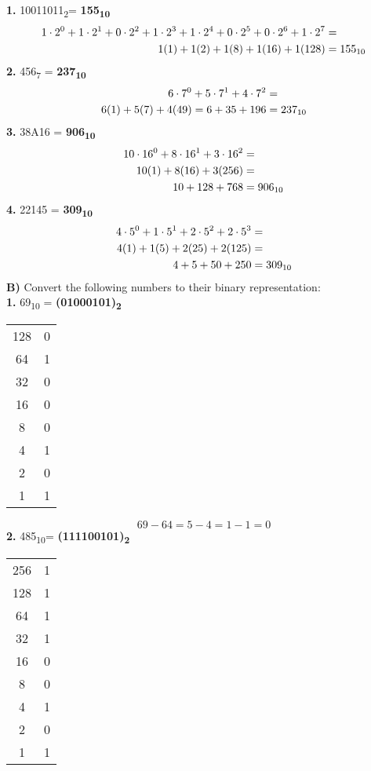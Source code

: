 \documentclass[12pt, letterpaper, twoside]{article}
\begin{document}
\noindent \textbf{1.}  10011011\textsubscript{2}= \textbf{155\textsubscript{10}}
\begin{align*}
1\cdot2^0+1\cdot2^1+0\cdot2^2+1\cdot2^3+1\cdot2^4+0\cdot2^5+0\cdot2^6+1\cdot2^7&= \\
1(1)+1(2)+1(8)+1(16)+1(128)&= 155\textsubscript{10}\\
\end{align*}
\break
\noindent \textbf{2.} 456\textsubscript{7} = \textbf{237\textsubscript{10}}
\begin{align*}
6\cdot7^0+5\cdot7^1+4\cdot7^2&=\\
6(1)+5(7)+4(49)=6+35+196&= 237\textsubscript{10}
\end{align*}
\break
\noindent \textbf{3.} 38A16 = \textbf{906\textsubscript{10}}
\begin{align*}
10\cdot 16 ^0+8\cdot 16 ^1+3\cdot 16 ^2&=\\
10(1)+8(16)+3(256) &=\\
10+128+768 &= 906\textsubscript{10} 
\end{align*}
\break
\noindent \textbf{4.} 22145 = \textbf{309\textsubscript{10}}
\begin{align*}
4\cdot5^0+1\cdot5^1+2\cdot5^2+2\cdot5^3&=\\
4(1)+1(5)+2(25)+2(125)&=\\
4+5+50+250&= 309\textsubscript{10}
\end{align*}
\break
\noindent \textbf{B)} Convert the following numbers to their binary representation:\\
\noindent \textbf{1.} 69\textsubscript{10} = \textbf{(01000101)\textsubscript{2}}
\begin{center}
\begin{tabular}{c|c}
128 & 0\\
64 & 1\\
32 & 0\\
16 & 0\\ 
8 & 0\\
4 & 1\\
2 & 0\\
1 & 1\\
\end{tabular}
\end{center}
\[69-64=5-4=1-1=0\]
\break
\newpage
\noindent \textbf{2.} 485\textsubscript{10}= \textbf{(111100101)\textsubscript{2}}
\begin{center}
\begin{tabular}{c|c}
256 & 1\\
128 & 1\\
64 & 1\\
32 & 1\\
16 & 0\\ 
8 & 0\\
4 & 1\\
2 & 0\\
1 & 1\\
\end{tabular}
\end{center}
\end{document}

